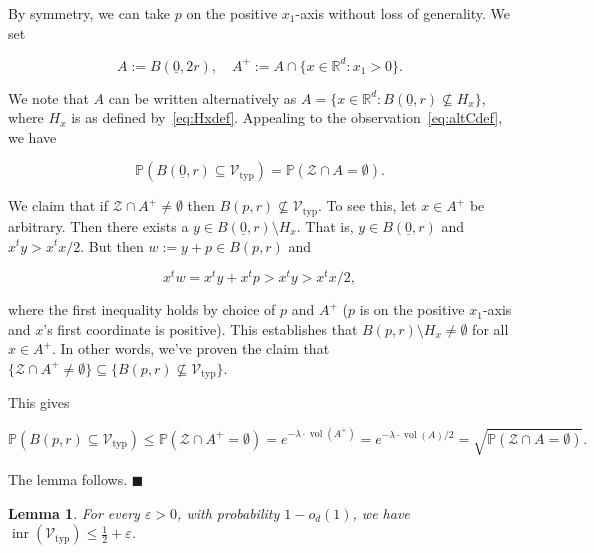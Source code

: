 \documentclass[11pt]{article}%
\newenvironment{proof}{\vspace{1ex}\noindent{\bf Proof.}}{\hspace*{\fill}$\blacksquare$\vspace{1ex}}
\newtheorem{lemma} [theorem] {Lemma}%
\newcommand{\Vcal}[0]{\ensuremath{{\mathcal V}}}
\newcommand{\Zcal}[0]{\ensuremath{{\mathcal Z}}}
\newcommand{\eR}[0]{\ensuremath{ \mathbb R}}
\newcommand{\Pee}[0]{\ensuremath{{\mathbb P}}}
\newcommand{\eps}{\varepsilon}
\newcommand{\orig}{\underline{0}}
\DeclareMathOperator{\vol}{vol}
\DeclareMathOperator{\inr}{inr}
\newcommand{\Vtyp}[0]{\Vcal_{\text{typ}}}
\begin{document}
\begin{proof}
By symmetry, we can take $p$ on the positive $x_1$-axis without loss of generality.
We set 

$$ A := B(\orig,2r), \quad A^+ := A \cap \{ x \in \eR^d : x_1 > 0 \}. $$

\noindent
We note that $A$ can be written alternatively as $A = \{ x \in \eR^d : B(\orig,r) \not\subseteq H_x \}$, 
where $H_x$ is as defined by~\eqref{eq:Hxdef}.
Appealing to the observation~\eqref{eq:altCdef}, we have

$$ \Pee( B(\orig,r) \subseteq \Vtyp ) = \Pee( \Zcal \cap A = \emptyset ). $$

We claim that if $\Zcal \cap A^+ \neq \emptyset$ then $B(p,r) \not\subseteq \Vtyp$.
To see this, let $x \in A^+$ be arbitrary.
Then there exists a $y \in B(\orig,r) \setminus H_x$.
That is, $y \in B(\orig,r)$ and $x^t y > x^tx / 2$.
But then $w := y + p \in B(p,r)$ and 

$$ x^t w = x^t y + x^t p > x^t y > x^t x / 2, $$

\noindent
where the first inequality holds by choice of $p$ and $A^+$ ($p$ is on the positive $x_1$-axis and $x$'s first coordinate is 
positive). This establishes that $B(p,r) \setminus H_x \neq \emptyset$ for all $x \in A^+$.
In other words, we've proven the claim that $\{\Zcal \cap A^+ \neq \emptyset\} \subseteq  \{B(p,r) \not\subseteq \Vtyp\}$.

This gives

$$ \Pee( B(p,r) \subseteq \Vtyp ) \leq \Pee( \Zcal \cap A^+ = \emptyset )
= e^{-\lambda\cdot\vol(A^+)}
= e^{-\lambda\cdot\vol(A)/2} 
= \sqrt{\Pee( \Zcal \cap A = \emptyset )}. $$

\noindent
The lemma follows.
\end{proof}

\begin{lemma}
 For every $\eps>0$, with probability $1-o_d(1)$, we have $\inr(\Vtyp) \leq \frac12 + \eps$.
\end{lemma}
\end{document}
